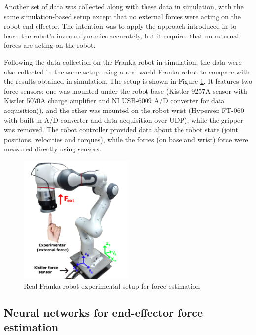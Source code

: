 Another set of data was collected along with these data in simulation, with the same simulation-based setup except that no external forces were acting on the robot end-effector. The intention was to apply the approach introduced in \cite{Lutter2019} to learn the robot's inverse dynamics accurately, but it requires that no external forces are acting on the robot.

Following the data collection on the Franka robot in simulation, the data were also collected in the same setup using a real-world Franka robot to compare with the results obtained in simulation. The setup is shown in Figure \ref{fig:FrankaExp}. It features two force sensors: one was mounted under the robot base (Kistler 9257A sensor with Kistler 5070A charge amplifier and NI USB-6009 A/D converter for data acquisition)), and the other was mounted on the robot wrist (Hypersen FT-060 with built-in A/D converter and data acquisition over UDP), while the gripper was removed. The robot controller provided data about the robot state (joint positions, velocities and torques), while the forces (on base and wrist) force were measured directly using sensors.

\begin{figure}
    \centering
    \includegraphics[width=0.5\textwidth]{slike/franka_exp.png}
    \caption{Real Franka robot experimental setup for force estimation}
    \label{fig:FrankaExp}
\end{figure}

\subsection{Neural networks for end-effector force estimation}

